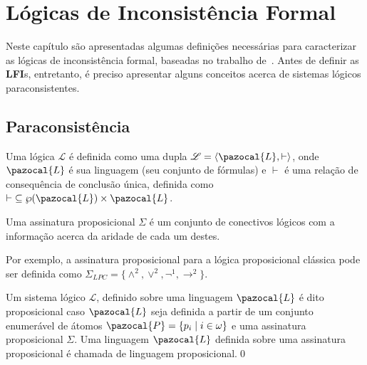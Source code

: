 \chapter{Lógicas de Inconsistência Formal}
\label{cap:LFIs}
Neste capítulo são apresentadas algumas definições necessárias para caracterizar as lógicas de inconsistência formal, baseadas no trabalho de~. Antes de definir as \textbf{LFI}s, entretanto, é preciso apresentar alguns conceitos acerca de sistemas lógicos paraconsistentes.

\section{Paraconsistência}
\label{sec:paracons}
Uma lógica $\mathcal{L}$ é definida como uma dupla $\mathcal{L} = \langle \pazocal{L},\vdash \rangle$, onde $\pazocal{L}$ é sua linguagem (seu conjunto de fórmulas) e $\vdash$ é uma relação de consequência de conclusão única, definida como $\vdash \;\subseteq \wp(\pazocal{L})\times\pazocal{L}$.

\begin{definicao}
    \label{def:ass_prop}
    Uma assinatura proposicional $\Sigma$ é um conjunto de conectivos lógicos com a informação acerca da aridade de cada um destes.
\end{definicao}
    Por exemplo, a assinatura proposicional para a lógica proposicional clássica pode ser definida como $\Sigma_{LPC} = \{\land^{2}, \lor^{2}, \neg^{1}, \rightarrow^{2}\}$.

\begin{definicao}
    \label{def:proposicional}
    Um sistema lógico $\mathcal{L}$, definido sobre uma linguagem $\pazocal{L}$ é dito proposicional caso $\pazocal{L}$ seja definida a partir de um conjunto enumerável de átomos $\pazocal{P} = \{p_{i} \;| \; i \in \omega \}$ e uma assinatura proposicional $\Sigma$. Uma linguagem $\pazocal{L}$ definida sobre uma assinatura proposicional é chamada de linguagem proposicional.\qed{}
\end{definicao}

